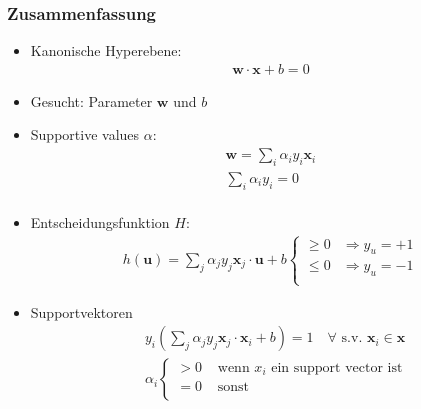 \begin{frame}
    \frametitle{Zusammenfassung}

    \begin{itemize}
        \item Kanonische Hyperebene:
            \begin{align*}
                \boldsymbol{w} \cdot \boldsymbol{x} + b = 0
            \end{align*}
        \item Gesucht: Parameter $\boldsymbol{w}$ und $b$
        \item Supportive values $\alpha$:
            \begin{align*}
                \boldsymbol{w} = \sum_i \alpha_i y_i \boldsymbol{x}_i \\
                \sum_i \alpha_i y_i = 0 \\
            \end{align*}
        \item Entscheidungsfunktion $H$:
            \begin{align*}
                h(\boldsymbol{u}) = \sum_j \alpha_j y_j \boldsymbol{x}_j \cdot \boldsymbol{u} + b \begin{cases}
                    \geq 0 & \Rightarrow y_u = +1 \\
                    \leq 0 & \Rightarrow y_u = -1 \\
                \end{cases}
            \end{align*}
        \item Supportvektoren
            \begin{align*}
                & y_i (\sum_j \alpha_j y_j \boldsymbol{x}_j \cdot \boldsymbol{x}_i + b) = 1 \quad \forall \text{ s.v. } \boldsymbol{x}_i \in \boldsymbol{x} \\
                & \alpha_i \begin{cases}
                    > 0 & \text{ wenn } x_i \text{ ein support vector ist} \\
                    = 0 & \text{ sonst} \\
                \end{cases} \\
            \end{align*}
    \end{itemize}
\end{frame}
